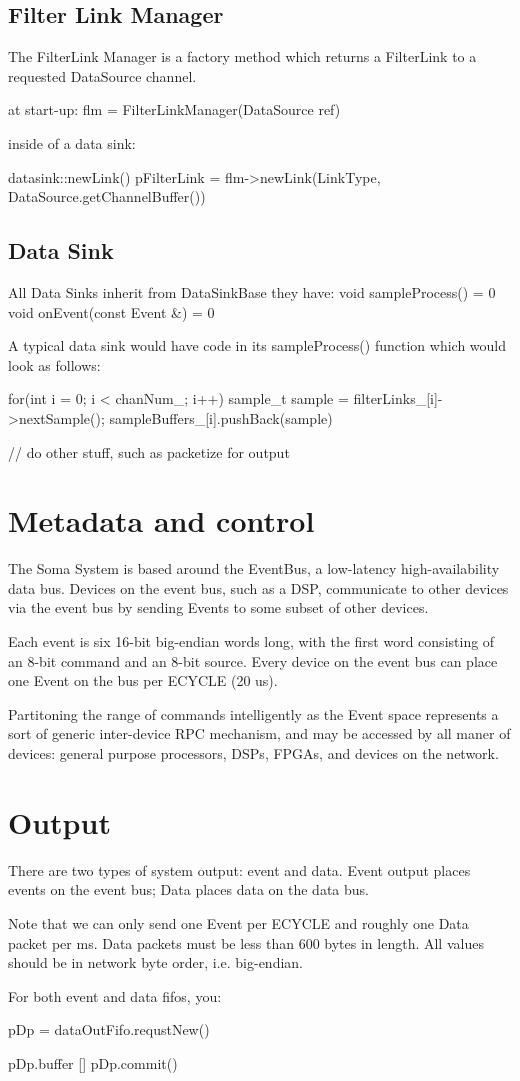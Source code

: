 \subsection{Filter Link Manager}
The FilterLink Manager is a factory method which returns a FilterLink to a requested DataSource channel. 

at start-up:
  flm = FilterLinkManager(DataSource ref) 
  
inside of a data sink: 

datasink::newLink()
   pFilterLink = flm->newLink(LinkType, DataSource.getChannelBuffer())


\subsection{Data Sink}
All Data Sinks inherit from DataSinkBase
they have: 
  void sampleProcess() = 0 
  void onEvent(const Event &) = 0


A typical data sink would have code in its sampleProcess() function
which would look as follows:

for(int i = 0; i < chanNum_; i++) {
   sample_t sample = filterLinks_[i]->nextSample(); 
   sampleBuffers_[i].pushBack(sample)
}

// do other stuff, such as packetize for output


\section{Metadata and control}
The Soma System is based around the EventBus, a low-latency
high-availability data bus. Devices on the event bus, such as a DSP,
communicate to other devices via the event bus by sending Events to
some subset of other devices.

Each event is six 16-bit big-endian words long, with the first word
consisting of an 8-bit command and an 8-bit source. Every device on
the event bus can place one Event on the bus per ECYCLE (20 us).

Partitoning the range of commands intelligently as the Event space
represents a sort of generic inter-device RPC mechanism, and may be
accessed by all maner of devices: general purpose processors, DSPs,
FPGAs, and devices on the network.


\section{Output} 
There are two types of system output: event and data. Event output
places events on the event bus; Data places data on the data bus.

Note that we can only send one Event per ECYCLE and roughly one Data
packet per ms. Data packets must be less than 600 bytes in length. All
values should be in network byte order, i.e. big-endian. 

For both event and data fifos, you: 

pDp = dataOutFifo.requstNew()

pDp.buffer []
pDp.commit()

